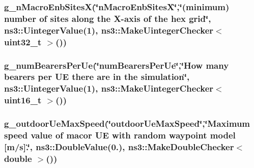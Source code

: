 \subsubsection[{\texorpdfstring{g\+\_\+n\+Macro\+Enb\+SitesX}{g_nMacroEnbSitesX}}]{ g\+\_\+n\+Macro\+Enb\+SitesX(\char`\"{}n\+Macro\+Enb\+SitesX\char`\"{},\char`\"{}(minimum) number of sites along the X-\/{\bf axis} of the hex grid\char`\"{}, ns3\+::\+Uinteger\+Value(1), {\bf ns3\+::\+Make\+Uinteger\+Checker}$<$ uint32\+\_\+t $>$())\hspace{0.3cm}{\ttfamily [static]}}\hypertarget{lena-dual-stripe_8cc_a4eb44b2b92a09e112cfa7798c7569725}{}\label{lena-dual-stripe_8cc_a4eb44b2b92a09e112cfa7798c7569725}
\subsubsection[{\texorpdfstring{g\+\_\+num\+Bearers\+Per\+Ue}{g_numBearersPerUe}}]{ g\+\_\+num\+Bearers\+Per\+Ue(\char`\"{}num\+Bearers\+Per\+Ue\char`\"{},\char`\"{}How many bearers per UE there are in the simulation\char`\"{}, ns3\+::\+Uinteger\+Value(1), {\bf ns3\+::\+Make\+Uinteger\+Checker}$<$ uint16\+\_\+t $>$())\hspace{0.3cm}{\ttfamily [static]}}\hypertarget{lena-dual-stripe_8cc_a88b6d21a90d9d78cd68f18d2be0a48f3}{}\label{lena-dual-stripe_8cc_a88b6d21a90d9d78cd68f18d2be0a48f3}
\subsubsection[{\texorpdfstring{g\+\_\+outdoor\+Ue\+Max\+Speed}{g_outdoorUeMaxSpeed}}]{ g\+\_\+outdoor\+Ue\+Max\+Speed(\char`\"{}outdoor\+Ue\+Max\+Speed\char`\"{},\char`\"{}Maximum {\bf speed} value of macor UE with random waypoint model \mbox{[}m/{\bf s}\mbox{]}.\char`\"{}, ns3\+::\+Double\+Value(0.), {\bf ns3\+::\+Make\+Double\+Checker}$<$ double $>$())\hspace{0.3cm}{\ttfamily [static]}}\hypertarget{lena-dual-stripe_8cc_ac9581ce2b933f961d3cf61b1f7b5e116}{}\label{lena-dual-stripe_8cc_ac9581ce2b933f961d3cf61b1f7b5e116}
